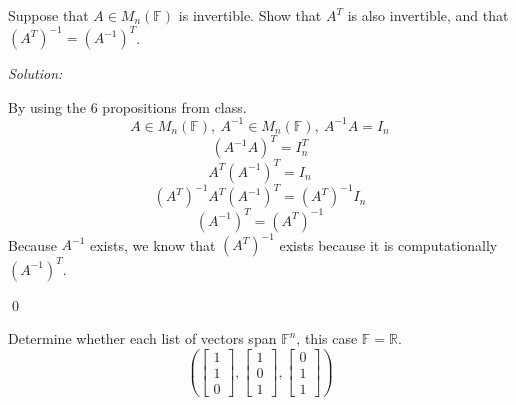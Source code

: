 \documentclass[11 pt]{article}
\newenvironment{problem}[2][Problem]{\begin{trivlist}
\item[\hskip \labelsep {\bfseries #1}\hskip \labelsep {\bfseries #2.}]}{\end{trivlist}}
\newenvironment{sol}
    {\emph{Solution:}
    }
    {
    \qed
    }
\newcommand{\R}{\mathbb{R}} %
\newcommand{\F}{\mathbb{F}} %
\begin{document}
\begin{problem}{2.3.10}
Suppose that $A\in M_n(\F)$ is invertible. Show that $A^T$ is also invertible, and that $(A^T)^{-1}=(A^{-1})^T$.
\end{problem}
\begin{sol}
By using the 6 propositions from class.
\[A\in M_n(\F),\ A^{-1}\in M_n(\F),\ A^{-1}A=I_n\]
\[(A^{-1}A)^T=I_n^T\]
\[A^T(A^{-1})^T=I_n\]
\[(A^T)^{-1}A^T(A^{-1})^T=(A^T)^{-1}I_n\]
\[(A^{-1})^T=(A^T)^{-1}\]
Because $A^{-1}$ exists, we know that $(A^T)^{-1}$ exists because it is computationally $(A^{-1})^T$.
\end{sol}


\begin{problem}{2.5.4d}
Determine whether each list of vectors span $\F^n$, this case $\F=\R$.
\[\left ( \begin{bmatrix}
1\\1\\0
\end{bmatrix},
\begin{bmatrix}
1\\0\\1
\end{bmatrix},
\begin{bmatrix}
0\\1\\1
\end{bmatrix}
\right )\]
\end{problem}
\end{document}
